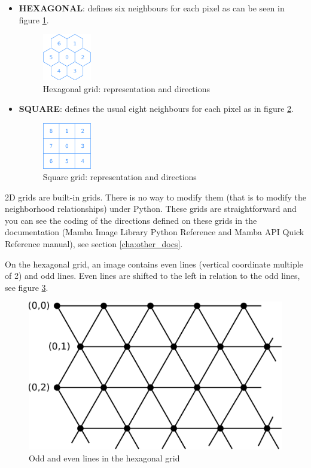 \documentclass[a4paper,10pt,oneside]{article}
\begin{document}
\begin{itemize}
\item \textbf{HEXAGONAL}: defines six neighbours for each pixel as can be seen in 
figure \ref{fig:hxgriddir}.

\begin{figure}
\centering
\includegraphics[width=0.2\textwidth]{figures/hexa_grid.pdf}
\caption{Hexagonal grid: representation and directions}
\label{fig:hxgriddir}
\end{figure}

\item \textbf{SQUARE}: defines the usual eight neighbours for each pixel as
in figure \ref{fig:sqgriddir}.

\begin{figure}
\centering
\includegraphics[width=0.2\textwidth]{figures/square_grid.pdf}
\caption{Square grid: representation and directions}
\label{fig:sqgriddir}
\end{figure}

\end{itemize}

2D grids are built-in grids. There is no way to modify them (that is to modify the neighborhood
relationships) under Python. These grids are straightforward and you can see the coding of the directions
defined on these grids in the documentation (Mamba Image Library Python Reference and Mamba API
Quick Reference manual), see section \ref{cha:other_docs}.

On the hexagonal grid, an image contains even lines (vertical coordinate multiple of 2) and odd lines. Even lines
are shifted to the left in relation to the odd lines, see figure \ref{fig:hex_grid}.
 
\begin{figure}
\centering
\includegraphics[scale=0.3]{figures/hex_grid.pdf}
\caption{Odd and even lines in the hexagonal grid}
\label{fig:hex_grid}
\end{figure}
\end{document}
